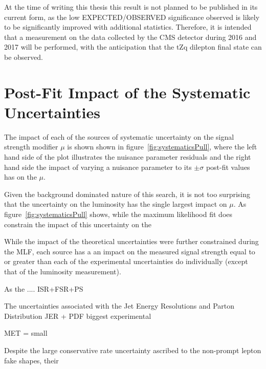 At the time of writing this thesis this result is not planned to be published in its current form, as the low EXPECTED/OBSERVED significance observed is likely to be significantly improved with additional statistics.
Therefore, it is intended that a measurement on the data collected by the CMS detector during 2016 and 2017 will be performed, with the anticipation that the tZq dilepton final state can be observed.

\section{Post-Fit Impact of the Systematic Uncertainties}\label{sec:uncertainitiesImpact}
The impact of each of the sources of systematic uncertainty on the signal strength modifier $\mu$ is shown shown in figure~\ref{fig:systematicsPull}, where the left hand side of the plot illustrates the nuisance parameter residuals and the right hand side the impact of varying a nuisance parameter to its $\pm \sigma$ post-fit values has on the $\mu$.


Given the background dominated nature of this search, it is not too surprising that the uncertainty on the luminosity has the single largest impact on $\mu$.
As figure~\ref{fig:systematicsPull} shows, while the maximum likelihood fit does constrain the impact of this uncertainty on the 
%

%

While the impact of the theoretical uncertainties were further constrained during the MLF, each source has a an impact on the measured signal strength equal to or greater than each of the experimental uncertainties do individually (except that of the luminosity measurement).

As the  .... ISR+FSR+PS


The uncertainties associated with the Jet Energy Resolutions and Parton Distribution 
JER + PDF biggest experimental  
 
MET = small 
 
Despite the large conservative rate uncertainty ascribed to the non-prompt lepton fake shapes, 
their

